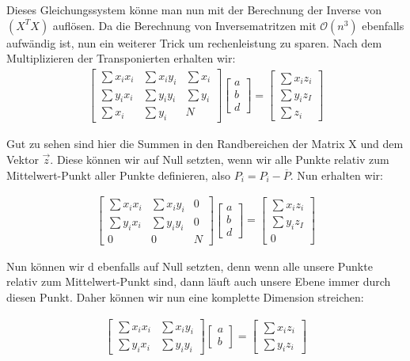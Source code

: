 \documentclass[11pt,oneside,openright]{mpreport}
\begin{document}
Dieses Gleichungssystem könne man nun mit der Berechnung der Inverse von $(X^TX)$ auflösen. Da die Berechnung von Inversematritzen mit $\mathcal{O}(n^3)$ ebenfalls aufwändig ist,
nun ein weiterer Trick um rechenleistung zu sparen.
Nach dem Multiplizieren der Transponierten erhalten wir:
\begin{align*}
\begin{bmatrix}
\sum x_i x_i & \sum x_i y_i & \sum x_i \\
\sum y_i x_i & \sum y_i y_i & \sum y_i \\
\sum x_i & \sum y_i & N
\end{bmatrix} 
\begin{bmatrix}
a \\
b \\
d 
\end{bmatrix} 
 = 
\begin{bmatrix}
\sum x_i z_i \\
\sum y_i z_I \\
\sum z_i 
\end{bmatrix} 
\end{align*}

Gut zu sehen sind hier die Summen in den Randbereichen der Matrix X und dem Vektor $\vec{z}$. Diese können wir auf Null setzten, wenn wir alle Punkte relativ zum Mittelwert-Punkt
aller Punkte definieren, also $P_i = P_i - \overline{P}$. Nun erhalten wir:

\begin{align*}
\begin{bmatrix}
\sum x_i x_i & \sum x_i y_i & 0 \\
\sum y_i x_i & \sum y_i y_i & 0 \\
0 & 0 & N
\end{bmatrix} 
\begin{bmatrix}
a \\
b \\
d 
\end{bmatrix} 
 = 
\begin{bmatrix}
\sum x_i z_i \\
\sum y_i z_I \\
0 
\end{bmatrix} 
\end{align*}

Nun können wir d ebenfalls auf Null setzten, denn wenn alle unsere Punkte relativ zum Mittelwert-Punkt sind, dann läuft auch unsere Ebene immer durch diesen Punkt. Daher können wir 
nun eine komplette Dimension streichen:

\begin{align*}
\begin{bmatrix}
\sum x_i x_i & \sum x_i y_i \\
\sum y_i x_i & \sum y_i y_i
\end{bmatrix} 
\begin{bmatrix}
a \\
b 
\end{bmatrix} 
 = 
\begin{bmatrix}
\sum x_i z_i \\
\sum y_i z_i
\end{bmatrix} 
\end{align*}
\end{document}
